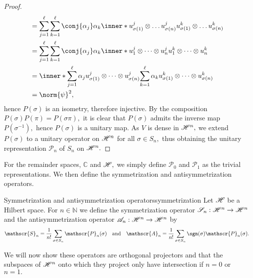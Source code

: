 \begin{proof}
\begin{align*}
                               &= \sum_{j = 1}^\ell{\sum_{k = 1}^\ell{\conj{\alpha_j} \alpha_k \inner*{u^j_{\sigma(1)}\otimes \dots u^j_{\sigma(n)}}{u^k_{\sigma(1)}\otimes \dots u^k_{\sigma(n)}}}}\\
                               &= \sum_{j = 1}^\ell{\sum_{k = 1}^\ell{\conj{\alpha_j} \alpha_k \inner*{u_1^j \otimes \dots \otimes u_n^j}{u_1^k \otimes \dots \otimes u_n^k}}}\\
                               &= \inner*{\sum_{j = 1}^\ell{\alpha_j u_{\sigma(1)}^j \otimes \dots \otimes u_{\sigma(n)}^j}}{\sum_{k = 1}^\ell{\alpha_k u_{\sigma(1)}^k \otimes \dots \otimes u_{\sigma(n)}^k}}\\
                               &= \norm{\psi}^2,
    \end{align*}
    hence \(P(\sigma)\) is an isometry, therefore injective. By the composition \(P(\sigma) P(\pi) = P(\sigma \pi),\) it is clear that \(P(\sigma)\) admits the inverse map \(P(\sigma^{-1}),\) hence \(P(\sigma)\) is a unitary map. As \(V\) is dense in \(\mathscr{H}^n,\) we extend \(P(\sigma)\) to a unitary operator on \(\mathscr{H}^n\) for all \(\sigma \in S_n,\) thus obtaining the unitary representation \(\mathscr{P}_n\) of \(S_n\) on \(\mathscr{H}^n.\)
\end{proof}
For the remainder spaces, \(\mathbb{C}\) and \(\mathscr{H},\) we simply define \(\mathscr{P}_0\) and \(\mathscr{P}_1\) as the trivial representations. We then define the symmetrization and antisymmetrization operators.
\begin{definition}{Symmetrization and antisymmetrization operators}{symmetrization}
    Let \(\mathscr{H}\) be a Hilbert space. For \(n \in \mathbb{N}\) we define the symmetrization operator \(\mathscr{S}_n : \mathscr{H}^n \to \mathscr{H}^n\) and the antisymmetrization operator \(\mathscr{A}_n : \mathscr{H}^n \to \mathscr{H}^n\) by
    \begin{equation*}
        \mathscr{S}_n = \frac{1}{n!} \sum_{\sigma \in S_n}{\mathscr{P}_n(\sigma)}
        \quad\text{and}\quad
        \mathscr{A}_n = \frac{1}{n!} \sum_{\sigma \in S_n}{\sgn(\sigma)\mathscr{P}_n(\sigma)}.
    \end{equation*}
\end{definition}
We will now show these operators are orthogonal projectors and that the subspaces of \(\mathscr{H}^n\) onto which they project only have intersection if \(n = 0\) or \(n = 1.\)
